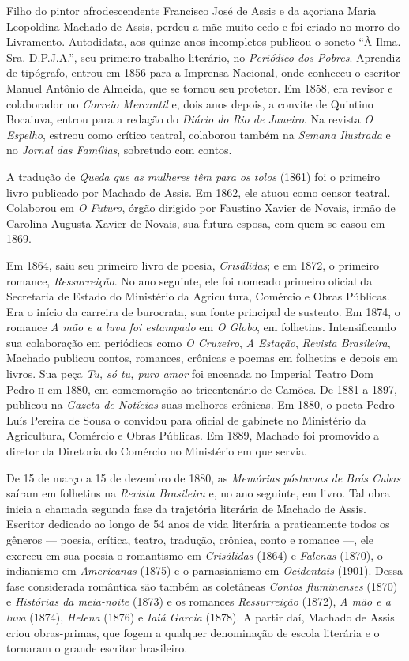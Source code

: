 Filho do pintor afrodescendente Francisco José de Assis e da açoriana
Maria Leopoldina Machado de Assis, perdeu a mãe muito cedo e foi criado
no morro do Livramento. Autodidata, aos quinze anos incompletos publicou
o soneto ``À Ilma. Sra. D.P.J.A.'', seu primeiro trabalho literário,
no \emph{Periódico dos Pobres}. Aprendiz de tipógrafo, entrou em 1856
para a Imprensa Nacional, onde conheceu o escritor Manuel Antônio de
Almeida, que se tornou seu protetor. Em 1858, era revisor e colaborador
no \emph{Correio Mercantil} e, dois anos depois, a convite de Quintino
Bocaiuva, entrou para a redação do \emph{Diário do Rio de Janeiro}. Na
revista \emph{O Espelho}, estreou como crítico teatral, colaborou também
na \emph{Semana Ilustrada} e no \emph{Jornal das Famílias}, sobretudo
com contos.

A tradução de \emph{Queda que as mulheres têm para os tolos} (1861) foi
o primeiro livro publicado por Machado de Assis. Em 1862, ele atuou como
censor teatral. Colaborou em \emph{O Futuro}, órgão dirigido por
Faustino Xavier de Novais, irmão de Carolina Augusta Xavier de Novais,
sua futura esposa, com quem se casou em 1869.

Em 1864, saiu seu primeiro livro de poesia, \emph{Crisálidas}; e em
1872, o primeiro romance, \emph{Ressurreição}. No ano seguinte, ele foi
nomeado primeiro oficial da Secretaria de Estado do Ministério da
Agricultura, Comércio e Obras Públicas. Era o início da carreira de
burocrata, sua fonte principal de sustento. Em 1874, o romance \emph{A
mão e a luva foi estampado} em \emph{O Globo}, em folhetins.
Intensificando sua colaboração em periódicos como \emph{O
Cruzeiro}, \emph{A Estação}, \emph{Revista Brasileira}, Machado publicou
contos, romances, crônicas e poemas em folhetins e depois em livros. Sua
peça \emph{Tu, só tu, puro amor} foi encenada no Imperial Teatro Dom
Pedro \textsc{ii} em 1880, em comemoração ao tricentenário de Camões. De 1881 a
1897, publicou na \emph{Gazeta de Notícias} suas melhores crônicas. Em
1880, o poeta Pedro Luís Pereira de Sousa o convidou para oficial de
gabinete no Ministério da Agricultura, Comércio e Obras Públicas. Em
1889, Machado foi promovido a diretor da Diretoria do Comércio no
Ministério em que servia.

De 15 de março a 15 de dezembro de 1880, as \emph{Memórias póstumas de
Brás Cubas} saíram em folhetins na \emph{Revista Brasileira} e, no ano
seguinte, em livro. Tal obra inicia a chamada segunda fase da trajetória
literária de Machado de Assis. Escritor dedicado ao longo de 54 anos de
vida literária a praticamente todos os gêneros --- poesia, crítica,
teatro, tradução, crônica, conto e romance ---, ele exerceu em sua poesia
o romantismo em \emph{Crisálidas} (1864) e \emph{Falenas} (1870), o
indianismo em \emph{Americanas} (1875) e o parnasianismo
em \emph{Ocidentais} (1901). Dessa fase considerada romântica são também
as coletâneas \emph{Contos fluminenses} (1870) e \emph{Histórias da
meia-noite} (1873) e os romances \emph{Ressurreição} (1872), \emph{A mão
e a luva} (1874), \emph{Helena} (1876) e \emph{Iaiá Garcia} (1878). A
partir daí, Machado de Assis criou obras-primas, que fogem a qualquer
denominação de escola literária e o tornaram o grande escritor
brasileiro.

